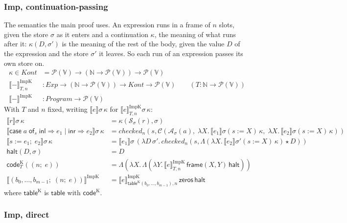 \documentclass[10pt]{article}
\theoremstyle{acmplain}
\newcommand{\SEM}[1]{\llbracket #1 \rrbracket}
\newcommand{\key}[1]{\mathsf{#1}}
\newcommand{\SET}[1]{\mathcal{P}(#1)}
\newcommand{\V}{\mathbb{V}}
\newcommand{\ext}[3]{#1(#2{:=}#3)}
\newcommand{\app}{\star}
\newcommand{\assign}[3]{#1 \mathrel{:=} #2;\; #3}
\newcommand{\Casei}[4]{\key{case}\;#1\;\key{of}_{#2}\;\key{inl} \Rightarrow #3 \mid \key{inr} \Rightarrow #4}
\begin{document}
\subsubsection{Imp, continuation-passing}

The semantics the main proof uses. An expression runs in a frame of $n$
slots, given the store $\sigma$ as it enters and a continuation $\kappa$,
the meaning of what runs after it: $\kappa(D, \sigma')$ is the meaning of
the rest of the body, given the value $D$ of the expression and the
store $\sigma'$ it leaves. So each run of an expression passes its own
store on.
\begin{align*}
  \kappa \in \mathit{Kont} &= \SET{\V} \to (\mathbb{N} \to \SET{\V}) \to \SET{\V} \\
  \SEM{-}^{\mathrm{ImpK}}_{T,n} &: \mathit{Exp} \to (\mathbb{N} \to \SET{\V}) \to \mathit{Kont} \to \SET{\V}
    \qquad (T : \mathbb{N} \to \SET{\V}) \\
  \SEM{-}^{\mathrm{ImpK}} &: \mathit{Program} \to \SET{\V}
\end{align*}
With $T$ and $n$ fixed, writing $\SEM{e}\sigma\,\kappa$ for $\SEM{e}^{\mathrm{ImpK}}_{T,n}\sigma\,\kappa$:
\begin{align*}
  \SEM{r}\sigma\,\kappa &= \kappa(\mathcal{S}_\sigma(r), \sigma) \\
  \SEM{\Casei{a}{s}{e_1}{e_2}}\sigma\,\kappa &= \mathit{checked}_n(s,
    \mathcal{C}(\mathcal{A}_\sigma(a),\; \lambda X.\, \SEM{e_1}\ext{\sigma}{s}{X}\,\kappa,\;
      \lambda X.\, \SEM{e_2}\ext{\sigma}{s}{X}\,\kappa)) \\
  \SEM{\assign{s}{e_1}{e_2}}\sigma\,\kappa &= \SEM{e_1}\sigma\,(\lambda D\, \sigma'.\,
    \mathit{checked}_n(s, \Lambda(\lambda X.\, \SEM{e_2}\ext{\sigma'}{s}{X}\,\kappa) \app D)) \\[1ex]
  \key{halt}(D, \sigma) &= D \\
  \key{code}^{\mathrm{K}}_T((n;\; e)) &= \Lambda(\lambda X.\, \Lambda(\lambda Y.\,
    \SEM{e}^{\mathrm{ImpK}}_{T,n}\,\key{frame}(X, Y)\,\key{halt})) \\
  \SEM{(b_0, \ldots, b_{m-1};\; (n;\; e))}^{\mathrm{ImpK}} &=
    \SEM{e}^{\mathrm{ImpK}}_{\key{table}^{\mathrm{K}}(b_0,\ldots,b_{m-1}),n}\,\key{zeros}\,\key{halt}
\end{align*}
where $\key{table}^{\mathrm{K}}$ is $\key{table}$ with $\key{code}^{\mathrm{K}}$.

\subsubsection{Imp, direct}
\end{document}
